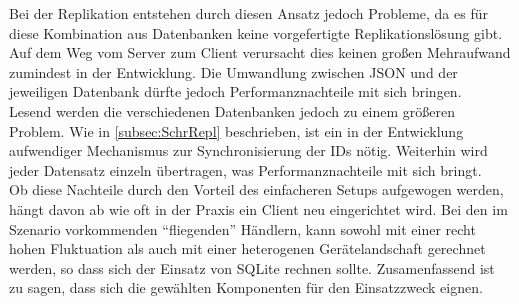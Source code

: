\documentclass[12pt,a4paper,ngerman,english]{report}
\begin{document}
Bei der Replikation entstehen durch diesen Ansatz jedoch Probleme, da es für diese Kombination aus Datenbanken keine vorgefertigte Replikationslösung gibt. Auf dem Weg vom Server zum Client verursacht dies keinen großen Mehraufwand zumindest in der Entwicklung. Die Umwandlung zwischen JSON und der jeweiligen Datenbank dürfte jedoch Performanznachteile mit sich bringen.\\

Lesend werden die verschiedenen Datenbanken jedoch zu einem größeren Problem. Wie in \autoref{subsec:SchrRepl} beschrieben, ist ein in der Entwicklung aufwendiger Mechanismus zur Synchronisierung der IDs nötig. Weiterhin wird jeder Datensatz einzeln übertragen, was Performanznachteile mit sich bringt.\\

Ob diese Nachteile durch den Vorteil des einfacheren Setups aufgewogen werden, hängt davon ab wie oft in der Praxis ein Client neu eingerichtet wird. Bei den im Szenario vorkommenden ``fliegenden'' Händlern, kann sowohl mit einer recht hohen Fluktuation als auch mit einer heterogenen Gerätelandschaft gerechnet werden, so dass sich der Einsatz von SQLite rechnen sollte. Zusamenfassend ist zu sagen, dass sich die gewählten Komponenten für den Einsatzzweck eignen.
\end{document}
